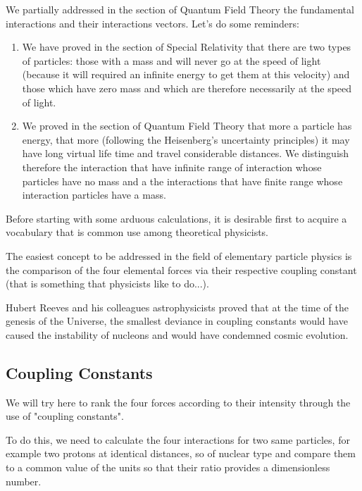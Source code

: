 	We partially addressed in the section of Quantum Field Theory the fundamental interactions and their interactions vectors. Let's do some reminders:
	\begin{enumerate}
		\item We have proved in the section of Special Relativity that there are two types of particles: those with a mass and will never go at the speed of light (because it will required an infinite energy to get them at this velocity) and those which have zero mass and which are therefore necessarily at the speed of light.
		\item We proved in the section of Quantum Field Theory that more a particle has energy, that more (following the Heisenberg's uncertainty principles) it may have long virtual life time and travel considerable distances. We distinguish therefore the interaction that have infinite range of interaction whose particles have no mass and a the interactions that have finite range whose interaction particles have a mass.
	\end{enumerate}
	Before starting with some arduous calculations, it is desirable first to acquire a vocabulary that is common use among theoretical physicists.
	
	The easiest concept to be addressed in the field of elementary particle physics is the comparison of the four elemental forces via their respective coupling constant (that is something that physicists like to do...).
	
	\begin{tcolorbox}[title=Remark,colframe=black,arc=10pt]
	Hubert Reeves and his colleagues astrophysicists proved that at the time of the genesis of the Universe, the smallest deviance in coupling constants would have caused the instability of nucleons and would have condemned cosmic evolution.
	\end{tcolorbox}
	
	\subsection{Coupling Constants}
	
	We will try here to rank the four forces according to their intensity through the use of "coupling constants".
	
	To do this, we need to calculate the four interactions for two same particles, for example two protons at identical distances, so of nuclear type and compare them to a common value of the units so that their ratio provides a dimensionless number.
	
